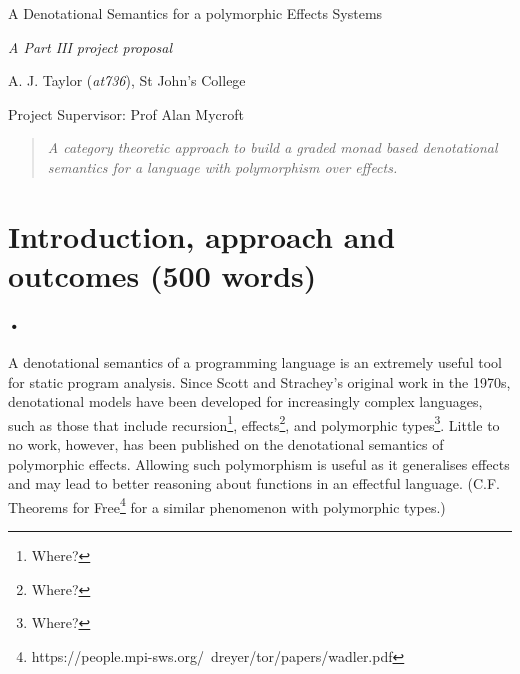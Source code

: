 \documentclass[11pt]{article}
\newcommand\comment[1]{}
\begin{document}
\centerline{\Large A Denotational Semantics for a polymorphic Effects Systems}
\vspace{2em}
\centerline{\Large \emph{A Part III project proposal}}
\vspace{2em}
\centerline{\large A. J. Taylor (\emph{at736}), St John's College}
\vspace{1em}
\centerline{\large Project Supervisor: Prof Alan Mycroft}
\vspace{1em}

\begin{abstract}
\textsl{
	A category theoretic approach to build a graded monad based denotational semantics for a language with polymorphism over effects.
} 
\end{abstract}

\section{Introduction, approach and outcomes (500 words)}

\comment{Provide an introduction to your project or essay. In particular, try to
  motivate the work and explain the relevant context (general
  background, as well as sufficient detail about any related
  work).}
  
\paragraph{•}{
A denotational semantics of a programming language is an extremely useful tool for static program analysis. Since Scott and Strachey's original work in the 1970s, denotational models have been developed for increasingly complex languages, such as those that include recursion\footnote{Where?}, effects\footnote{Where?}, and polymorphic types\footnote{Where?}. Little to no work, however, has been published on the denotational semantics of polymorphic effects. Allowing such polymorphism is useful as it generalises effects and may lead to better reasoning about functions in an effectful language. (C.F. Theorems for Free\footnote{https://people.mpi-sws.org/~dreyer/tor/papers/wadler.pdf} for a similar phenomenon with polymorphic types.)
}
\end{document}
